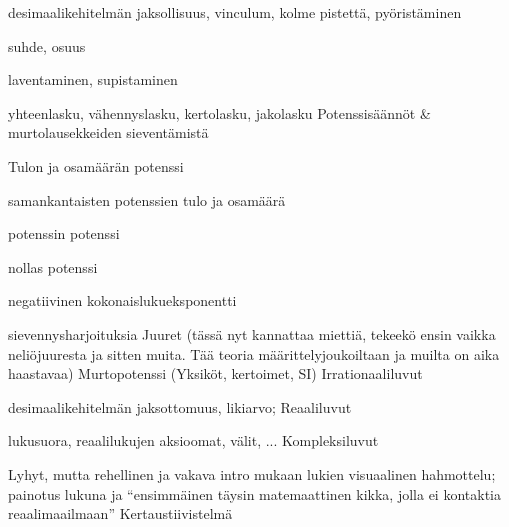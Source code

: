 desimaalikehitelmän jaksollisuus, vinculum, kolme pistettä, pyöristäminen

suhde, osuus

laventaminen, supistaminen

yhteenlasku, vähennyslasku, kertolasku, jakolasku
Potenssisäännöt \& murtolausekkeiden sieventämistä

Tulon ja osamäärän potenssi

samankantaisten potenssien tulo ja osamäärä

potenssin potenssi

nollas potenssi

negatiivinen kokonaislukueksponentti

sievennysharjoituksia
Juuret (tässä nyt kannattaa miettiä, tekeekö ensin vaikka neliöjuuresta ja sitten muita. Tää teoria määrittelyjoukoiltaan ja muilta on aika haastavaa)
Murtopotenssi
(Yksiköt, kertoimet, SI)
Irrationaaliluvut

desimaalikehitelmän jaksottomuus, likiarvo;
Reaaliluvut

lukusuora, reaalilukujen aksioomat, välit, ...
Kompleksiluvut

Lyhyt, mutta rehellinen ja vakava intro mukaan lukien visuaalinen hahmottelu; painotus lukuna ja “ensimmäinen täysin matemaattinen kikka, jolla ei kontaktia reaalimaailmaan”
Kertaustiivistelmä







